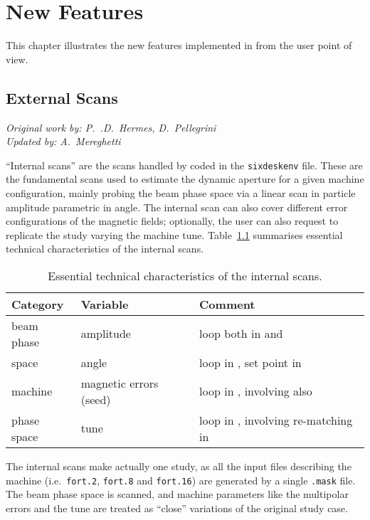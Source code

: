 \chapter{New Features} \label{NewFeatures}
This chapter illustrates the new features implemented in \SIXDESK{} from
the user point of view.

\section{External Scans} \label{ExternalScans}
\begin{flushright}
\emph{Original work by: P.~.D.~Hermes, D.~Pellegrini} \\
\emph{Updated by: A.~Mereghetti}
\end{flushright}
``Internal scans'' are the scans handled by \SIXDESK{} coded
in the \texttt{sixdeskenv} file. These are the fundamental
scans used to estimate the dynamic aperture for a given machine configuration,
mainly probing the beam phase space via a linear scan in particle amplitude
parametric in angle. The internal scan can also cover different error
configurations of the magnetic fields; optionally, the user can also request
to replicate the study varying the machine tune.
Table~\ref{tab:InternalScanParamters} summarises essential technical
characteristics of the internal scans.
\begin{table}[h]
\begin{center}
    \caption{Essential technical
      characteristics of the internal scans.}
    \label{tab:InternalScanParamters}
    \begin{tabular}{|l|l|l|}
    \hline
    \rowcolor{blue!30}
    \textbf{Category} & \textbf{Variable} & \textbf{Comment} \\
    \hline
    beam phase & amplitude & loop both in \SIXTRACK{} and \SIXDESK{} \\
    space      & angle     & loop in \SIXDESK{}, set point in \SIXTRACK{} \\
    \hline
    machine & magnetic errors (seed) &
    loop in \SIXDESK{}, involving also \MADX{} \\
    phase space & tune &
    loop in \SIXDESK{}, involving re-matching in \SIXTRACK{} \\
    \hline
    \end{tabular}
\end{center}
\end{table}

The internal scans make actually one study, as all the
\SIXTRACK{} input files describing the machine (i.e.~\texttt{fort.2},
\texttt{fort.8} and \texttt{fort.16}) are generated by a single \texttt{.mask}
file. The beam phase space is scanned, and machine parameters like the
multipolar errors and the tune are treated as ``close'' variations of the
original study case.

